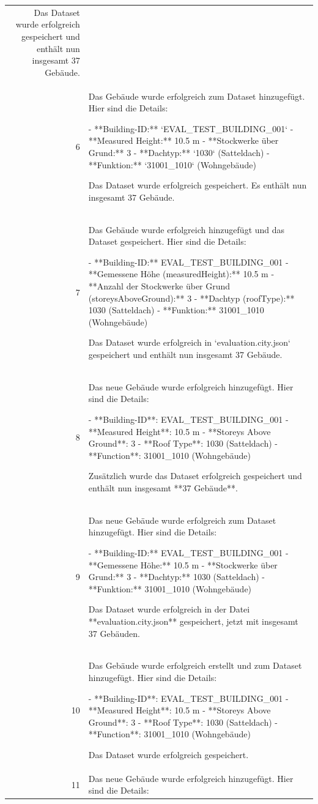 \documentclass[a4paper,11pt]{article}
\begin{document}
\begin{table}[ht]
\begin{tabular}{r p{12cm}}
Das Dataset wurde erfolgreich gespeichert und enthält nun insgesamt 37 Gebäude. \\
6 & Das Gebäude wurde erfolgreich zum Dataset hinzugefügt. Hier sind die Details:

- **Building-ID:** `EVAL\_TEST\_BUILDING\_001`
- **Measured Height:** 10.5 m
- **Stockwerke über Grund:** 3
- **Dachtyp:** `1030` (Satteldach)
- **Funktion:** `31001\_1010` (Wohngebäude)

Das Dataset wurde erfolgreich gespeichert. Es enthält nun insgesamt 37 Gebäude. \\
7 & Das Gebäude wurde erfolgreich hinzugefügt und das Dataset gespeichert. Hier sind die Details:

- **Building-ID:** EVAL\_TEST\_BUILDING\_001
- **Gemessene Höhe (measuredHeight):** 10.5 m
- **Anzahl der Stockwerke über Grund (storeysAboveGround):** 3
- **Dachtyp (roofType):** 1030 (Satteldach)
- **Funktion:** 31001\_1010 (Wohngebäude)

Das Dataset wurde erfolgreich in `evaluation.city.json` gespeichert und enthält nun insgesamt 37 Gebäude. \\
8 & Das neue Gebäude wurde erfolgreich hinzugefügt. Hier sind die Details:

- **Building-ID**: EVAL\_TEST\_BUILDING\_001
- **Measured Height**: 10.5 m
- **Storeys Above Ground**: 3
- **Roof Type**: 1030 (Satteldach)
- **Function**: 31001\_1010 (Wohngebäude)

Zusätzlich wurde das Dataset erfolgreich gespeichert und enthält nun insgesamt **37 Gebäude**. \\
9 & Das neue Gebäude wurde erfolgreich zum Dataset hinzugefügt. Hier sind die Details:

- **Building-ID:** EVAL\_TEST\_BUILDING\_001
- **Gemessene Höhe:** 10.5 m
- **Stockwerke über Grund:** 3
- **Dachtyp:** 1030 (Satteldach)
- **Funktion:** 31001\_1010 (Wohngebäude)

Das Dataset wurde erfolgreich in der Datei **evaluation.city.json** gespeichert, jetzt mit insgesamt 37 Gebäuden. \\
10 & Das Gebäude wurde erfolgreich erstellt und zum Dataset hinzugefügt. Hier sind die Details:

- **Building-ID**: EVAL\_TEST\_BUILDING\_001
- **Measured Height**: 10.5 m
- **Storeys Above Ground**: 3
- **Roof Type**: 1030 (Satteldach)
- **Function**: 31001\_1010 (Wohngebäude)

Das Dataset wurde erfolgreich gespeichert.  \\
11 & Das neue Gebäude wurde erfolgreich hinzugefügt. Hier sind die Details:


\end{tabular}
\end{table}
\end{document}
